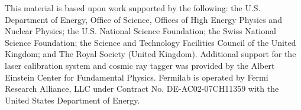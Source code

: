 \begin{acknowledgments}
This material is based upon work supported by the following: the
U.S. Department of Energy, Office of Science, Offices of High Energy
Physics and Nuclear Physics; the U.S. National Science Foundation; the
Swiss National Science Foundation; the Science and Technology
Facilities Council of the United Kingdom; and The Royal Society
(United Kingdom). Additional support for the laser calibration system
and cosmic ray tagger was provided by the Albert Einstein Center for
Fundamental Physics. Fermilab is operated by Fermi Research Alliance,
LLC under Contract No. DE-AC02-07CH11359 with the United States
Department of Energy.
\end{acknowledgments}